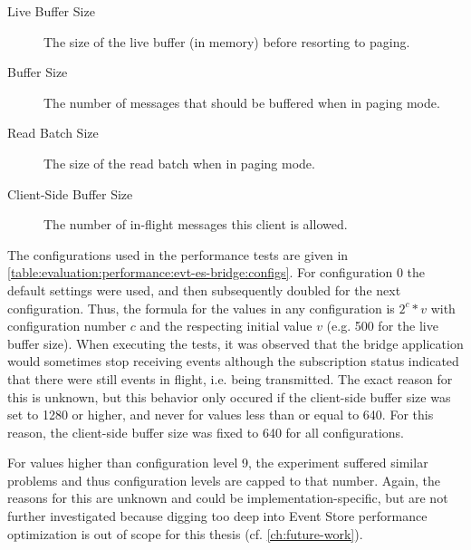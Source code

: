 \begin{description}
\item[Live Buffer Size] The size of the live buffer (in memory) before resorting to paging.
\item[Buffer Size] The number of messages that should be buffered when in paging mode.
\item[Read Batch Size] The size of the read batch when in paging mode.
\item[Client-Side Buffer Size] The number of in-flight messages this client is allowed.
\end{description}

The configurations used in the performance tests are given in \cref{table:evaluation:performance:evt-es-bridge:configs}.
For configuration 0 the default settings were used, and then subsequently doubled for the next configuration.
Thus, the formula for the values in any configuration is $ 2^c * v $ with configuration number $c$ and the respecting initial value $v$ (e.g. 500 for the live buffer size).
When executing the tests, it was observed that the bridge application would sometimes stop receiving events although the subscription status indicated that there were still events in flight, i.e. being transmitted.
The exact reason for this is unknown, but this behavior only occured if the client-side buffer size was set to 1280 or higher, and never for values less than or equal to 640. For this reason, the client-side buffer size was fixed to 640 for all configurations.

For values higher than configuration level 9, the experiment suffered similar problems and thus configuration levels are capped to that number.
Again, the reasons for this are unknown and could be implementation-specific, but are not further investigated because digging too deep into Event Store performance optimization is out of scope for this thesis (cf. \cref{ch:future-work}).

